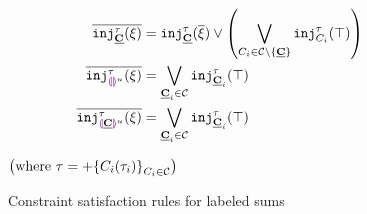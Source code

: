 
\begin{figure}[ht]
\begin{minipage}[t][][b]{.47\linewidth}

  \begin{mathpar}
  \end{mathpar}


  \begin{mathpar}
  \end{mathpar}
\end{minipage}
\begin{minipage}[t][][b]{.47\linewidth}

  \begin{align*}
    \cdual{\cinj{\tagC}{\tau}{\xi}}              & = \cinj{\tagC}{\tau}{\cdual{\xi}} \vee \left(
    \bigvee_{C_i \in \tagset \setminus \{\tagC\}} \cinj{C_i}{\tau}{\ctruth}
    \right)                                                                                                      \\
    \cdual{\cinj{\tagehole{u}}{\tau}{\xi}}       & = \bigvee_{\tagC_i \in \tagset} \cinj{\tagC_i}{\tau}{\ctruth} \\
    \cdual{\cinj{\taghole{\tagC}{u}}{\tau}{\xi}} & = \bigvee_{\tagC_i \in \tagset} \cinj{\tagC_i}{\tau}{\ctruth}
  \end{align*}
  
  $\left(\text{where }\tau = \tlabeledsum{C_i(\tau_i)}_{C_i \in \tagset}\right)$
\end{minipage}

  \begin{mathpar}

  \end{mathpar}

  \caption{Constraint satisfaction rules for labeled sums}
  \label{fig:labeled-sums-constraint-rules}
\end{figure}
